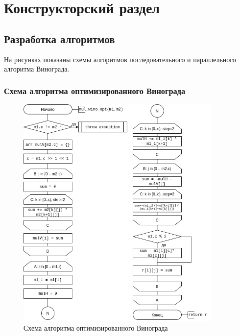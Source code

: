 \chapter{Конструкторский раздел}
\label{cha:design}


\section{Разработка алгоритмов}

На рисунках показаны схемы алгоритмов
последовательного и параллельного алгоритма Винограда.


\subsection{Схема алгоритма оптимизированного Винограда}

\begin{figure}[h!]
    \centering
    \includegraphics[width=0.9\textwidth]{4/inc/d1.png}
    \caption{Схема алгоритма оптимизированного Винограда}
    \label{fig:2.2}
\end{figure}

\clearpage
